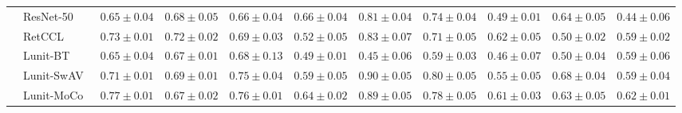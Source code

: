 \begin{tabular}{ll|cccc|c|cccc}
 & ResNet-50~\cite{he2015deep} & $0.65 \pm 0.04$ & $0.68 \pm 0.05$ & $0.66 \pm 0.04$ & $\mathbf{0.66 \pm 0.04}$ & $0.81 \pm 0.04$ & $0.74 \pm 0.04$ & $0.49 \pm 0.01$ & $0.64 \pm 0.05$ & $0.44 \pm 0.06$ \\
 & RetCCL~\cite{wang2023retccl} & $0.73 \pm 0.01$ & $0.72 \pm 0.02$ & $0.69 \pm 0.03$ & $0.52 \pm 0.05$ & $0.83 \pm 0.07$ & $0.71 \pm 0.05$ & $0.62 \pm 0.05$ & $0.50 \pm 0.02$ & $0.59 \pm 0.02$ \\
 & Lunit-BT~\cite{kang2023benchmarking} & $0.65 \pm 0.04$ & $0.67 \pm 0.01$ & $0.68 \pm 0.13$ & $0.49 \pm 0.01$ & $0.45 \pm 0.06$ & $0.59 \pm 0.03$ & $0.46 \pm 0.07$ & $0.50 \pm 0.04$ & $0.59 \pm 0.06$ \\
 & Lunit-SwAV~\cite{kang2023benchmarking} & $0.71 \pm 0.01$ & $0.69 \pm 0.01$ & $0.75 \pm 0.04$ & $0.59 \pm 0.05$ & $0.90 \pm 0.05$ & $0.80 \pm 0.05$ & $0.55 \pm 0.05$ & $0.68 \pm 0.04$ & $0.59 \pm 0.04$ \\
 & Lunit-MoCo~\cite{kang2023benchmarking} & $0.77 \pm 0.01$ & $0.67 \pm 0.02$ & $0.76 \pm 0.01$ & $0.64 \pm 0.02$ & $0.89 \pm 0.05$ & $0.78 \pm 0.05$ & $0.61 \pm 0.03$ & $0.63 \pm 0.05$ & $0.62 \pm 0.01$ \\
\cline{1-11}
\bottomrule
\end{tabular}
